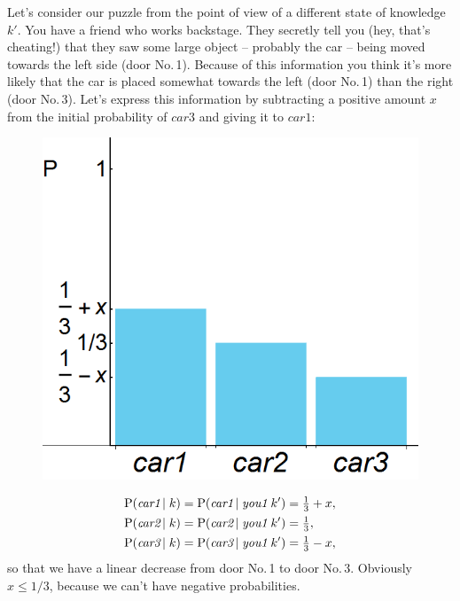 \documentclass[\ifafour a4paper,12pt,\else a5paper,10pt,\fi%
onecolumn,oneside,article,%
british%
]{memoir}
\theoremstyle{remark}
\theoremstyle{innote}
\renewcommand*{\le}{\leqslant}%
\newcommand*{\p}{\mathrm{P}}%
\renewcommand*{\|}{\nonscript\,\vert\nonscript\;\mathopen{}}
\newcommand*{\cara}{\textit{car1}}
\newcommand*{\carb}{\textit{car2}}
\newcommand*{\carc}{\textit{car3}}
\newcommand*{\youa}{\textit{you1}}
\begin{document}
Let's consider our puzzle from the point of view of a different state of
knowledge $k'$. You have a friend who works backstage. They secretly tell
you (hey, that's cheating!) that they saw some large object -- probably the
car -- being moved towards the left side (door No.\,1). Because of this
information you think it's more likely that the car is placed somewhat
towards the left (door No.\,1) than the right (door No.\,3). Let's express
this information by subtracting a positive amount $x$ from the initial
probability of $\carc$ and giving it to $\cara$:%
\setlength{\intextsep}{0.1ex}%
\begin{figure}%
\centering\includegraphics[width=\linewidth]{carnew.png}%
\vspace{-3em}%
\end{figure}
\begin{equation}
  \label{eq:new_probscar}
    \begin{split}
    &\p(\cara \|k) = \p(\cara\|\youa\;k') = \tfrac{1}{3} +x,\\
    &\p(\carb \|k) = \p(\carb\|\youa\;k') = \tfrac{1}{3},\\
    &\p(\carc \|k) = \p(\carc\|\youa\;k') = \tfrac{1}{3} -x,
  \end{split}
\end{equation}
so that we have a linear decrease from door No.\,1 to door No.\,3.
Obviously $x\le 1/3$, because we can't have negative probabilities.
\end{document}
